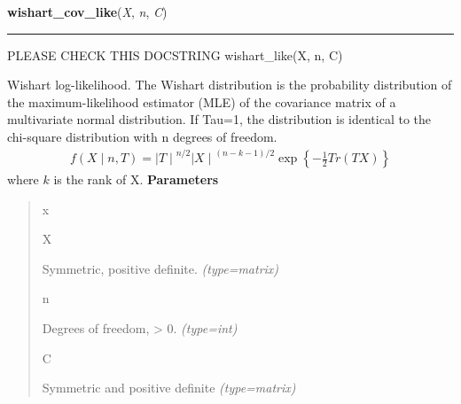     \label{pymc:distributions:wishart_cov_like}

    \vspace{0.5ex}

\hspace{.8\funcindent}\begin{boxedminipage}{\funcwidth}

    \raggedright \textbf{wishart\_cov\_like}(\textit{X}, \textit{n}, \textit{C})

    \vspace{-1.5ex}

    \rule{\textwidth}{1pt}
\setlength{\parskip}{2ex}

PLEASE CHECK THIS DOCSTRING
wishart{\_}like(X, n, C)

Wishart log-likelihood. The Wishart distribution is the probability
distribution of the maximum-likelihood estimator (MLE) of the covariance
matrix of a multivariate normal distribution. If Tau=1, the distribution
is identical to the chi-square distribution with n degrees of freedom.
\begin{equation*}\begin{split}f(X \mid n, T) = {\mid T \mid}^{n/2}{\mid X \mid}^{(n-k-1)/2} \exp\left\{ -\frac{1}{2} Tr(TX) \right\}\end{split}\end{equation*}
where $k$ is the rank of X.
\setlength{\parskip}{1ex}
      \textbf{Parameters}
      \vspace{-1ex}

      \begin{quote}
        \begin{Ventry}{x}

          \item[X]


Symmetric, positive definite.
            {\it (type=matrix)}

          \item[n]


Degrees of freedom, {\textgreater} 0.
            {\it (type=int)}

          \item[C]


Symmetric and positive definite
            {\it (type=matrix)}

        \end{Ventry}

      \end{quote}

    \end{boxedminipage}

